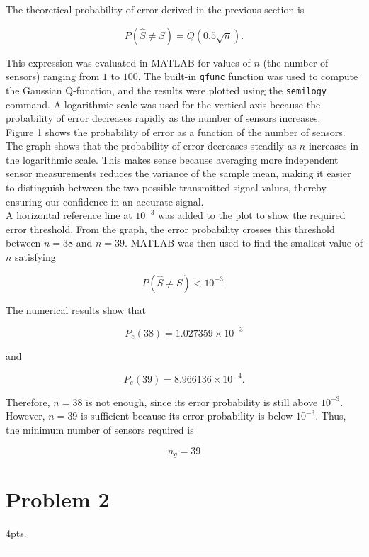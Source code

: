 \documentclass[12pt,a4paper]{article}
\begin{document}
\clearpage

The theoretical probability of error derived in the previous section is

\[
P(\hat{S}\neq S)=Q(0.5\sqrt{n}).
\]

This expression was evaluated in MATLAB for values of \(n\) (the number of sensors) ranging from \(1\) to \(100\). The built-in \texttt{qfunc} function was used to compute the Gaussian Q-function, and the results were plotted using the \texttt{semilogy} command. A logarithmic scale was used for the vertical axis because the probability of error decreases rapidly as the number of sensors increases.\\

Figure 1 shows the probability of error as a function of the number of sensors. The graph shows that the probability of error decreases steadily as \(n\) increases in the logarithmic scale. This makes sense because averaging more independent sensor measurements reduces the variance of the sample mean, making it easier to distinguish between the two possible transmitted signal values, thereby ensuring our confidence in an accurate signal.\\

A horizontal reference line at \(10^{-3}\) was added to the plot to show the required error threshold. From the graph, the error probability crosses this threshold between \(n=38\) and \(n=39\). MATLAB was then used to find the smallest value of \(n\) satisfying

\[
P(\hat{S}\neq S)<10^{-3}.
\]

The numerical results show that

\[
P_e(38)=1.027359\times 10^{-3}
\]

and

\[
P_e(39)=8.966136\times 10^{-4}.
\]

Therefore, \(n=38\) is not enough, since its error probability is still above \(10^{-3}\). However, \(n=39\) is sufficient because its error probability is below \(10^{-3}\). Thus, the minimum number of sensors required is

\[
\boxed{\displaystyle n_g = 39}
\]

\clearpage 

\section{Problem 2}
4pts.\\

\hrule 
\end{document}
